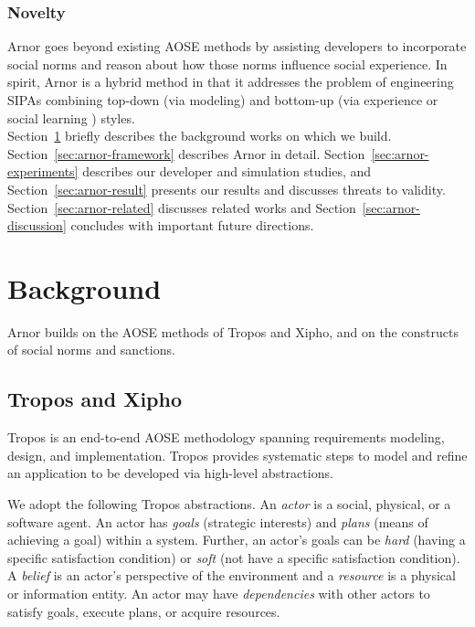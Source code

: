 \documentclass[11pt,          %
               phd,           %
               onehalfspacing %
               ]{ncsuthesis}
\newcommand{\frameworkA}{Arnor\xspace}
\begin{document}
\subsubsection*{Novelty}
\frameworkA goes beyond existing AOSE methods by assisting
developers to incorporate social norms and reason about how those norms
influence social experience. In spirit, \frameworkA is a hybrid method in
that it addresses the problem of engineering SIPAs combining top-down (via
modeling) and bottom-up (via experience or social learning
\citep{Sen-IJCAI07-NormEmergence}) styles.\\

Section~\ref{sec:arnor-preliminaries} briefly describes the background
works on which we build. Section~\ref{sec:arnor-framework} describes
\frameworkA in detail. Section~\ref{sec:arnor-experiments} describes our
developer and simulation studies, and Section~\ref{sec:arnor-result}
presents our results and discusses threats to validity.
Section~\ref{sec:arnor-related} discusses related works and
Section~\ref{sec:arnor-discussion} concludes with important future
directions.

\section{Background}
\label{sec:arnor-preliminaries}

\frameworkA builds on the AOSE methods of Tropos and Xipho, and on the 
constructs of social norms and sanctions.

\subsection{Tropos and Xipho}
\label{subsec:background}

Tropos \citep{Bresciani-JAAMAS04-Tropos} is an end-to-end AOSE
methodology spanning requirements modeling, design, and implementation.
Tropos provides systematic steps to model and refine an application to
be developed via high-level abstractions.

We adopt the following Tropos abstractions. An \emph{actor} is a social,
physical, or a software agent. An actor has \emph{goals} (strategic
interests) and \emph{plans} (means of achieving a goal) within a
system. Further, an actor's goals can be \emph{hard} (having a specific
satisfaction condition) or \emph{soft} (not have a specific satisfaction 
condition). A \emph{belief} is an actor's perspective of the environment and a
\emph{resource} is a physical or information entity. An actor may have
\emph{dependencies} with other actors to satisfy goals, execute plans,
or acquire resources.
\end{document}
